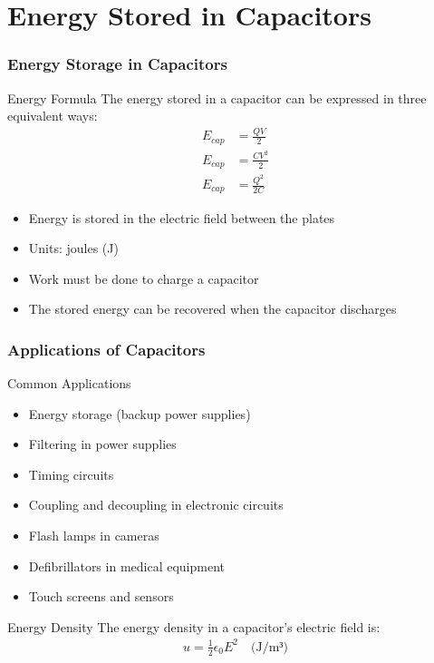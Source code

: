 \documentclass{beamer}
\begin{document}
\section{Energy Stored in Capacitors}

\begin{frame}
    \frametitle{Energy Storage in Capacitors}
    
    \begin{block}{Energy Formula}
        The energy stored in a capacitor can be expressed in three equivalent ways:
        \begin{align}
            E_{cap} &= \frac{QV}{2} \\
            E_{cap} &= \frac{CV^2}{2} \\
            E_{cap} &= \frac{Q^2}{2C}
        \end{align}
    \end{block}
    
    \begin{itemize}
        \item Energy is stored in the electric field between the plates
        \item Units: joules (J)
        \item Work must be done to charge a capacitor
        \item The stored energy can be recovered when the capacitor discharges
    \end{itemize}
\end{frame}

\begin{frame}
    \frametitle{Applications of Capacitors}
    
    \begin{block}{Common Applications}
        \begin{itemize}
            \item Energy storage (backup power supplies)
            \item Filtering in power supplies
            \item Timing circuits
            \item Coupling and decoupling in electronic circuits
            \item Flash lamps in cameras
            \item Defibrillators in medical equipment
            \item Touch screens and sensors
        \end{itemize}
    \end{block}
    
    \begin{block}{Energy Density}
        The energy density in a capacitor's electric field is:
        \begin{align}
            u = \frac{1}{2}\epsilon_0 E^2 \quad \text{(J/m³)}
        \end{align}
    \end{block}
\end{frame}
\end{document}
